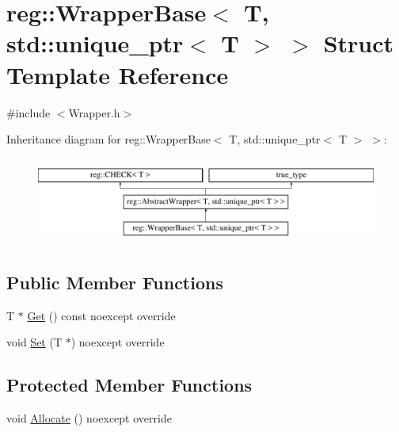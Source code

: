 \hypertarget{structreg_1_1_wrapper_base_3_01_t_00_01std_1_1unique__ptr_3_01_t_01_4_01_4}{}\section{reg\+:\+:Wrapper\+Base$<$ T, std\+:\+:unique\+\_\+ptr$<$ T $>$ $>$ Struct Template Reference}
\label{structreg_1_1_wrapper_base_3_01_t_00_01std_1_1unique__ptr_3_01_t_01_4_01_4}


{\ttfamily \#include $<$Wrapper.\+h$>$}

Inheritance diagram for reg\+:\+:Wrapper\+Base$<$ T, std\+:\+:unique\+\_\+ptr$<$ T $>$ $>$\+:\begin{figure}[H]
\begin{center}
\leavevmode
\includegraphics[height=2.866894cm]{structreg_1_1_wrapper_base_3_01_t_00_01std_1_1unique__ptr_3_01_t_01_4_01_4}
\end{center}
\end{figure}
\subsection*{Public Member Functions}
\begin{DoxyCompactItemize}
\item 
T $\ast$ \hyperlink{structreg_1_1_wrapper_base_3_01_t_00_01std_1_1unique__ptr_3_01_t_01_4_01_4_a9f4701d60f0dee6b61ae4046633f3ebe}{Get} () const noexcept override
\item 
void \hyperlink{structreg_1_1_wrapper_base_3_01_t_00_01std_1_1unique__ptr_3_01_t_01_4_01_4_a280dc1e6a85e2a95eaa849a45169942f}{Set} (T $\ast$) noexcept override
\end{DoxyCompactItemize}
\subsection*{Protected Member Functions}
\begin{DoxyCompactItemize}
\item 
void \hyperlink{structreg_1_1_wrapper_base_3_01_t_00_01std_1_1unique__ptr_3_01_t_01_4_01_4_a1b7e67476da7973f319d68e65543d1be}{Allocate} () noexcept override
\end{DoxyCompactItemize}
